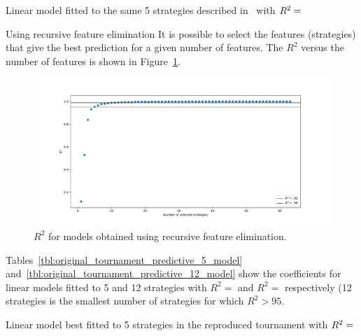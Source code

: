 \documentclass{article}
\begin{document}
\begin{table}[!hbtp]
        \centering
        
        \caption{Linear model fitted to the same 5 strategies described
                 in~\cite{Axelrod1980b} with
             \(R^2=\protect\)}
        \label{tbl:original_tournament_predictive_with_axelrod_5_model}
\end{table}

Using recursive feature elimination
It is possible to select the features (strategies) that give the best prediction
for a given number of features. The \(R^2\) versus the number of features is
shown in
Figure~\ref{fig:original_tournament_r_squared_versus_number_of_features}.

\begin{figure}[!hbtp]
    \centering
    \includegraphics[width=.8\textwidth]{assets/original_tournament_r_squared_versus_number_of_features.pdf}
    \caption{\(R^2\) for models obtained using recursive feature elimination.}
    \label{fig:original_tournament_r_squared_versus_number_of_features}
\end{figure}


Tables~\ref{tbl:original_tournament_predictive_5_model}
and~\ref{tbl:original_tournament_predictive_12_model} show the coefficients for
linear models fitted to 5 and 12 strategies with
\(R^2=\) and
\(R^2=\)
respectively (12 strategies is the smallest number of strategies for which
\(R^2>95\).


\begin{table}[!hbtp]
        \centering
        
        \caption{Linear model best fitted to 5 strategies in the reproduced tournament
                 with
             \(R^2=\protect\)}
        \label{tbl:original_tournament_predictive_5_model}
\end{table}
\end{document}
